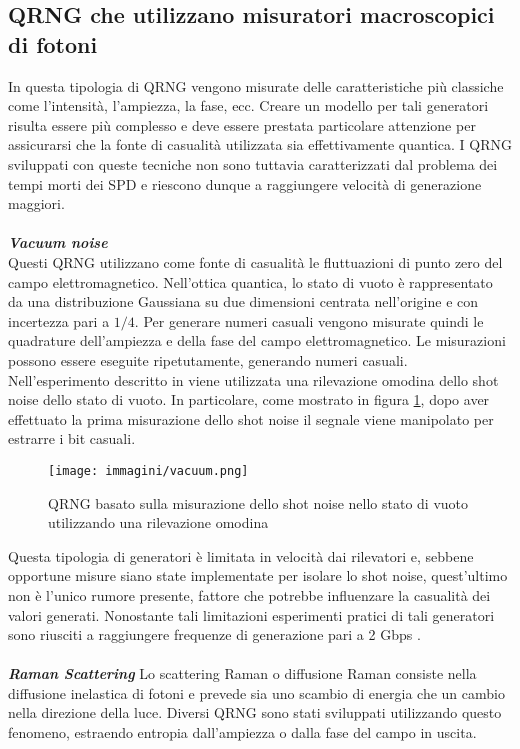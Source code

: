 \subsection{QRNG che utilizzano misuratori macroscopici di fotoni}
In questa tipologia di QRNG vengono misurate delle caratteristiche più classiche come l'intensità, l'ampiezza, la fase, ecc. Creare un modello per tali generatori risulta essere più complesso e deve essere prestata particolare attenzione per assicurarsi che la fonte di casualità utilizzata sia effettivamente quantica. I QRNG sviluppati con queste tecniche non sono tuttavia caratterizzati dal problema dei tempi morti dei SPD e riescono dunque a raggiungere velocità di generazione maggiori.
\\
\\
\textbf{\textit{Vacuum noise}}\\
Questi QRNG utilizzano come fonte di casualità le fluttuazioni di punto zero del campo elettromagnetico. Nell'ottica quantica, lo stato di vuoto è rappresentato da una distribuzione Gaussiana su due dimensioni centrata nell'origine e con incertezza pari a $1/4$. Per generare numeri casuali vengono misurate quindi le quadrature dell'ampiezza e della fase del campo elettromagnetico. Le misurazioni possono essere eseguite ripetutamente, generando numeri casuali. Nell'esperimento descritto in \cite{shen_practical_2010} viene utilizzata una rilevazione omodina dello shot noise dello stato di vuoto. In particolare, come mostrato in figura \ref{fig:vacuum}, dopo aver effettuato la prima misurazione dello shot noise il segnale viene manipolato per estrarre i bit casuali. 

\begin{figure}[h]
    \centering
    \texttt{[image: immagini/vacuum.png]}
    \caption{QRNG basato sulla misurazione dello shot noise nello stato di vuoto utilizzando una rilevazione omodina}
    \label{fig:vacuum}
\end{figure}

Questa tipologia di generatori è limitata in velocità dai rilevatori e, sebbene opportune misure siano state implementate per isolare lo shot noise, quest'ultimo non è l'unico rumore presente, fattore che potrebbe influenzare la casualità dei valori generati. Nonostante tali limitazioni esperimenti pratici di tali generatori sono riusciti a raggiungere frequenze di generazione pari a 2 Gbps \cite{symul_real_2011}.
\\
\\
\textbf{\textit{Raman Scattering}}
Lo scattering Raman o diffusione Raman consiste nella diffusione inelastica di fotoni e prevede sia uno scambio di energia che un cambio nella direzione della luce. Diversi QRNG sono stati sviluppati utilizzando questo fenomeno, estraendo entropia dall'ampiezza \cite{bustard_quantum_2013} o dalla fase \cite{bustard_quantum_2011} del campo in uscita.  

